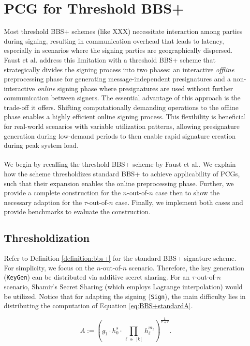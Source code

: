 \chapter{PCG for Threshold BBS+}
Most threshold BBS+ schemes (like XXX) necessitate interaction among parties during signing, resulting in communication overhead that leads to latency, especially in scenarios where the signing parties are geographically dispersed. Faust et al. \cite{cryptoeprint:2023/1076} address this limitation with a threshold BBS+ scheme that strategically divides the signing process into two phases: an interactive \textit{offline} preprocessing phase for generating message-independent presignatures and a non-interactive \textit{online} signing phase where presignatures are used without further communication between signers. The essential advantage of this approach is the trade-off it offers. Shifting computationally demanding operations to the offline phase enables a highly efficient online signing process. This flexibility is beneficial for real-world scenarios with variable utilization patterns, allowing presignature generation during low-demand periods to then enable rapid signature creation during peak system load. 
\\\\
We begin by recalling the threshold BBS+ scheme by Faust et al.. We explain how the scheme thresholdizes standard BBS+ to achieve applicability of PCGs, such that their expansion enables the online preprocessing phase. Further, we provide a complete construction for the $n$-out-of-$n$ case then to show the necessary adaption for the $\tau$-out-of-$n$ case. Finally, we implement both cases and provide benchmarks to evaluate the construction.

\section{Thresholdization}
Refer to Definition \ref{definition:bbs+} for the standard BBS+ signature scheme. For simplicity, we focus on the $n$-out-of-$n$ scenario. Therefore, the key generation (\texttt{\textup{KeyGen}}) can be distributed via additive secret sharing. For an $\tau$-out-of-$n$ scenario, Shamir's Secret Sharing  \cite{shamir1979share} (which employs Lagrange interpolation) would be utilized. Notice that for adapting the signing (\texttt{\textup{Sign}}), the main difficulty lies in distributing the computation of Equation \ref{eq:BBS+standardA}.

\begin{equation}
A := \left( g_1\cdot h_0^s\cdot \prod_{\ell \in [k]} h_{\ell}^{m_{\ell}} \right)^{\frac{1}{x+e}}.
\label{eq:BBS+standardA}
\end{equation}

